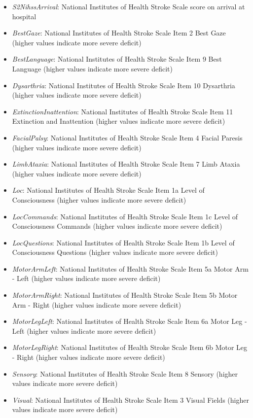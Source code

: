 \begin{itemize}
\item \emph{S2NihssArrival}: National Institutes of Health Stroke Scale score on
  arrival at hospital
\item \emph{BestGaze}: National Institutes of Health Stroke Scale Item 2 Best Gaze
  (higher values indicate more severe deficit)
\item \emph{BestLanguage}: National Institutes of Health Stroke Scale Item 9 Best
  Language (higher values indicate more severe deficit)
\item \emph{Dysarthria}: National Institutes of Health Stroke Scale Item 10
  Dysarthria (higher values indicate more severe deficit)
\item \emph{ExtinctionInattention}: National Institutes of Health Stroke Scale Item
  11 Extinction and Inattention (higher values indicate more severe
  deficit)
\item \emph{FacialPalsy}: National Institutes of Health Stroke Scale Item 4 Facial
  Paresis (higher values indicate more severe deficit)
\item \emph{LimbAtaxia}: National Institutes of Health Stroke Scale Item 7 Limb
  Ataxia (higher values indicate more severe deficit)
\item \emph{Loc}: National Institutes of Health Stroke Scale Item 1a Level of
  Consciousness (higher values indicate more severe deficit)
\item \emph{LocCommands}: National Institutes of Health Stroke Scale Item 1c Level
  of Consciousness Commands (higher values indicate more severe deficit)
\item \emph{LocQuestions}: National Institutes of Health Stroke Scale Item 1b Level
  of Consciousness Questions (higher values indicate more severe
  deficit)
\item \emph{MotorArmLeft}: National Institutes of Health Stroke Scale Item 5a Motor
  Arm - Left (higher values indicate more severe deficit)
\item \emph{MotorArmRight}: National Institutes of Health Stroke Scale Item 5b
  Motor Arm - Right (higher values indicate more severe deficit)
\item \emph{MotorLegLeft}: National Institutes of Health Stroke Scale Item 6a Motor
  Leg - Left (higher values indicate more severe deficit)
\item \emph{MotorLegRight}: National Institutes of Health Stroke Scale Item 6b
  Motor Leg - Right (higher values indicate more severe deficit)
\item \emph{Sensory}: National Institutes of Health Stroke Scale Item 8 Sensory
  (higher values indicate more severe deficit)
\item \emph{Visual}: National Institutes of Health Stroke Scale Item 3 Visual
  Fields (higher values indicate more severe deficit)
\end{itemize}

